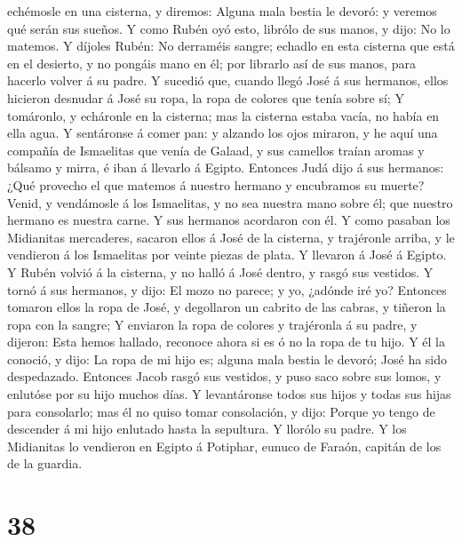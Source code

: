 echémosle en una cisterna, y diremos: Alguna mala bestia le devoró: y
veremos qué serán sus sueños.  Y como Rubén oyó esto,
librólo de sus manos, y dijo: No lo matemos.  Y díjoles
Rubén: No derraméis sangre; echadlo en esta cisterna que está en el
desierto, y no pongáis mano en él; por librarlo así de sus manos, para
hacerlo volver á su padre.  Y sucedió que, cuando llegó
José á sus hermanos, ellos hicieron desnudar á José su ropa, la ropa de
colores que tenía sobre sí;  Y tomáronlo, y echáronle en
la cisterna; mas la cisterna estaba vacía, no había en ella agua.
 Y sentáronse á comer pan: y alzando los ojos miraron, y
he aquí una compañía de Ismaelitas que venía de Galaad, y sus camellos
traían aromas y bálsamo y mirra, é iban á llevarlo á Egipto.
 Entonces Judá dijo á sus hermanos: ¿Qué provecho el que
matemos á nuestro hermano y encubramos su muerte?  Venid,
y vendámosle á los Ismaelitas, y no sea nuestra mano sobre él; que
nuestro hermano es nuestra carne. Y sus hermanos acordaron con él.
 Y como pasaban los Midianitas mercaderes, sacaron ellos
á José de la cisterna, y trajéronle arriba, y le vendieron á los
Ismaelitas por veinte piezas de plata. Y llevaron á José á Egipto.
 Y Rubén volvió á la cisterna, y no halló á José dentro,
y rasgó sus vestidos.  Y tornó á sus hermanos, y dijo: El
mozo no parece; y yo, ¿adónde iré yo?  Entonces tomaron
ellos la ropa de José, y degollaron un cabrito de las cabras, y tiñeron
la ropa con la sangre;  Y enviaron la ropa de colores y
trajéronla á su padre, y dijeron: Esta hemos hallado, reconoce ahora si
es ó no la ropa de tu hijo.  Y él la conoció, y dijo: La
ropa de mi hijo es; alguna mala bestia le devoró; José ha sido
despedazado.  Entonces Jacob rasgó sus vestidos, y puso
saco sobre sus lomos, y enlutóse por su hijo muchos días.
 Y levantáronse todos sus hijos y todas sus hijas para
consolarlo; mas él no quiso tomar consolación, y dijo: Porque yo tengo
de descender á mi hijo enlutado hasta la sepultura. Y llorólo su padre.
 Y los Midianitas lo vendieron en Egipto á Potiphar,
eunuco de Faraón, capitán de los de la guardia.

\hypertarget{section-37}{%
\section{38}\label{section-37}}

